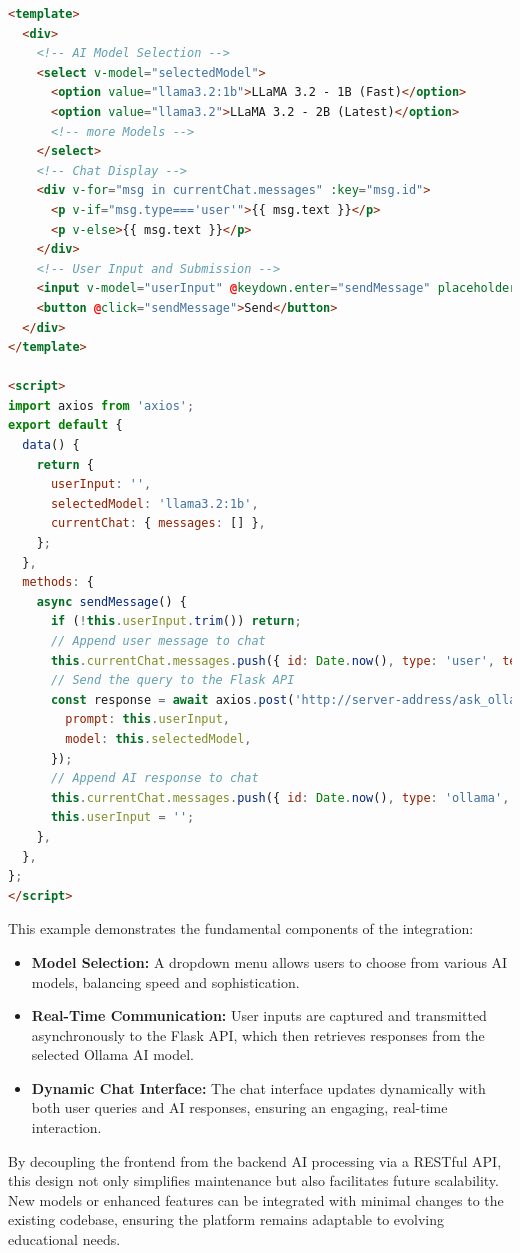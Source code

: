 \begin{lstlisting}[language=html, caption={Abbreviated Vue.js Integration Example}, frame=single]
<template>
  <div>
    <!-- AI Model Selection -->
    <select v-model="selectedModel">
      <option value="llama3.2:1b">LLaMA 3.2 - 1B (Fast)</option>
      <option value="llama3.2">LLaMA 3.2 - 2B (Latest)</option>
      <!-- more Models -->
    </select>
    <!-- Chat Display -->
    <div v-for="msg in currentChat.messages" :key="msg.id">
      <p v-if="msg.type==='user'">{{ msg.text }}</p>
      <p v-else>{{ msg.text }}</p>
    </div>
    <!-- User Input and Submission -->
    <input v-model="userInput" @keydown.enter="sendMessage" placeholder="Ask the AI question..." />
    <button @click="sendMessage">Send</button>
  </div>
</template>

<script>
import axios from 'axios';
export default {
  data() {
    return {
      userInput: '',
      selectedModel: 'llama3.2:1b',
      currentChat: { messages: [] },
    };
  },
  methods: {
    async sendMessage() {
      if (!this.userInput.trim()) return;
      // Append user message to chat
      this.currentChat.messages.push({ id: Date.now(), type: 'user', text: this.userInput });
      // Send the query to the Flask API
      const response = await axios.post('http://server-address/ask_ollama', {
        prompt: this.userInput,
        model: this.selectedModel,
      });
      // Append AI response to chat
      this.currentChat.messages.push({ id: Date.now(), type: 'ollama', text: response.data.choices[0].text });
      this.userInput = '';
    },
  },
};
</script>
\end{lstlisting}

This example demonstrates the fundamental components of the integration:
\begin{itemize}
  \item \textbf{Model Selection:} A dropdown menu allows users to choose from various AI models, balancing speed and sophistication.
  \item \textbf{Real-Time Communication:} User inputs are captured and transmitted asynchronously to the Flask API, which then retrieves responses from the selected Ollama AI model.
  \item \textbf{Dynamic Chat Interface:} The chat interface updates dynamically with both user queries and AI responses, ensuring an engaging, real-time interaction.
\end{itemize}

By decoupling the frontend from the backend AI processing via a RESTful API, this design not only simplifies maintenance but also facilitates future scalability. New models or enhanced features can be integrated with minimal changes to the existing codebase, ensuring the platform remains adaptable to evolving educational needs.


